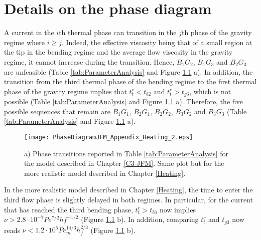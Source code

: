 \chapter{Details on the phase diagram}
\label{chap:A2}


A current in the $i$th thermal phase can transition in the $j$th phase
of the gravity regime where $i \ge j$. Indeed, the effective viscosity
being that of a small region at  the tip in the bending regime and the
average  flow viscosity  in  the gravity  regime,  it cannot  increase
during  the transition.   Hence, $B_1G_2$,  $B_1G_3$ and  $B_2G_3$ are
unfeasible     (Table    \ref{tab:ParameterAnalysis}     and    Figure
\ref{PD_ALLpossible} a).   In addition, the transition  from the third
thermal phase of the bending regime  to the first thermal phase of the
gravity regime  implies that $t_t^c<t_{b2}$ and  $t_t^c>t_{g3}$, which
is   not  possible   (Table  \ref{tab:ParameterAnalysis}   and  Figure
\ref{PD_ALLpossible} a).  Therefore, the  five possible sequences that
remain are $B_1G_1$, $B_2G_1$,  $B_2G_2$, $B_3G_2$ and $B_3G_3$ (Table
\ref{tab:ParameterAnalysis} and Figure \ref{PD_ALLpossible} a).

\begin{figure}[h!]
  \begin{center}
    \graphicspath{ {/Users/thorey/Documents/These/Projet/Refroidissement/Skin_Model/Figure/Figure_Heating/} }
    \texttt{[image: PhaseDiagramJFM\_Appendix\_Heating\_2.eps]}
    \caption{a)     Phase     transitions    reported     in     Table
      \ref{tab:ParameterAnalysis} for  the model described  in Chapter
      \ref{C3-JFM}.   Same  plot  but  for the  more  realistic  model
      described in Chapter \ref{Heating}.}
    \label{PD_ALLpossible}
  \end{center}
\end{figure}

In the  more realistic model  described in Chapter  \ref{Heating}, the
time  to enter  the  third  flow phase  is  slightly  delayed in  both
regimes. In  particular, for  the current that  has reached  the third
bending        phase,         $t_t^c>t_{b3}$        now        implies
$\nu>2.8\cdot10^{-7}  Pe^{7/2}hf^{-1/2}$ (Figure  \ref{PD_ALLpossible}
b).    In  addition,   comparing  $t_t^c$   and  $t_{g3}$   now  reads
$\nu<1.2\cdot 10^5  Pe_m^{14/3}h_f^{2/3}$ (Figure \ref{PD_ALLpossible}
b).

